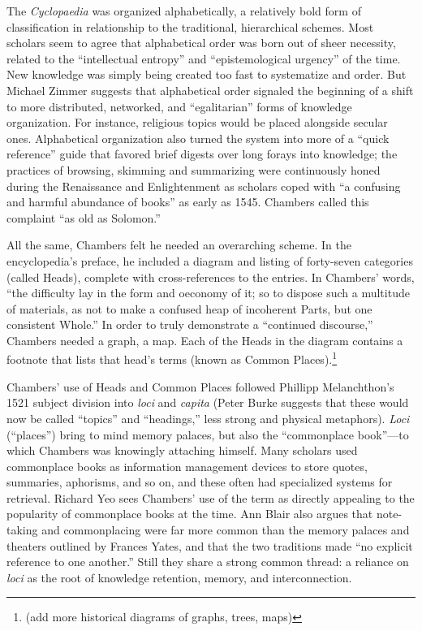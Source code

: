 The \emph{Cyclopaedia} was organized alphabetically, a relatively bold form of classification in relationship to the traditional, hierarchical schemes. Most scholars seem to agree that alphabetical order was born out of sheer necessity, related to the ``intellectual entropy'' and ``epistemological urgency'' of the time.\autocite[5]{rosenberg_early_2003} New knowledge was simply being created too fast to systematize and order. But Michael Zimmer suggests that alphabetical order signaled the beginning of a shift to more distributed, networked, and ``egalitarian'' forms of knowledge organization.\autocite[100]{zimmer_renvois_2009} For instance, religious topics would be placed alongside secular ones. Alphabetical organization also turned the system into more of a ``quick reference'' guide that favored brief digests over long forays into knowledge; the practices of browsing, skimming and summarizing were continuously honed during the Renaissance and Enlightenment as scholars coped with ``a confusing and harmful abundance of books'' as early as 1545.\autocite{blair_reading_2003} Chambers called this complaint ``as old as Solomon.''\autocite[65]{yeo_solution_2003}

All the same, Chambers felt he needed an overarching scheme. In the encyclopedia's preface, he included a diagram and listing of forty-seven categories (called Heads), complete with cross-references to the entries. In Chambers' words, ``the difficulty lay in the form and oeconomy of it; so to dispose such a multitude of materials, as not to make a confused heap of incoherent Parts, but one consistent Whole.''\autocite[67]{yeo_solution_2003} In order to truly demonstrate a ``continued discourse,'' Chambers needed a graph, a map. Each of the Heads in the diagram contains a footnote that lists that head's terms (known as Common Places).\footnote{(add more historical diagrams of graphs, trees, maps)}

Chambers' use of Heads and Common Places followed Phillipp Melanchthon's 1521 subject division into \emph{loci} and \emph{capita} (Peter Burke suggests that these would now be called ``topics'' and ``headings,'' less strong and physical metaphors).\autocite[95]{burke_social_2000} \emph{Loci} (``places'') bring to mind memory palaces, but also the ``commonplace book''---to which Chambers was knowingly attaching himself. Many scholars used commonplace books as information management devices to store quotes, summaries, aphorisms, and so on, and these often had specialized systems for retrieval. Richard Yeo sees Chambers' use of the term as directly appealing to the popularity of commonplace books at the time.\autocite[65-66]{yeo_solution_2003} Ann Blair also argues that note-taking and commonplacing were far more common than the memory palaces and theaters outlined by Frances Yates, and that the two traditions made ``no explicit reference to one another.''\autocite[``Note Taking as an Aid to Memory'']{blair_too_2010} Still they share a strong common thread: a reliance on \emph{loci} as the root of knowledge retention, memory, and interconnection.

